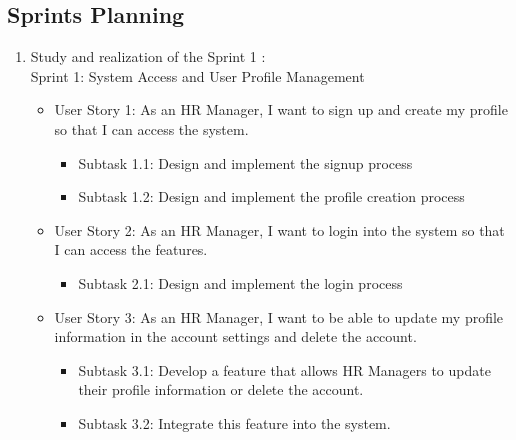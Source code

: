 \subsection{Sprints Planning}
\begin{enumerate}
    \item Study and realization of the Sprint 1 : \\
    Sprint 1: System Access and User Profile Management
    \begin{itemize}
        \renewcommand\labelitemi{-}
        \item User Story 1: As an HR Manager, I want to sign up and create my profile so that I can access the system. \\
        \begin{itemize}
            \item Subtask 1.1: Design and implement the signup process
            \item Subtask 1.2: Design and implement the profile creation process
        \end{itemize}    
        \item User Story 2: As an HR Manager, I want to login into the system so that I can access the features. \\
        \begin{itemize}
            \item Subtask 2.1: Design and implement the login process
        \end{itemize}   
        \item User Story 3: As an HR Manager, I want to be able to update my profile information in the account settings and delete the account. \\
        \begin{itemize}
            \item Subtask 3.1: Develop a feature that allows HR Managers to update their profile information or delete the account.
            \item Subtask 3.2: Integrate this feature into the system.
        \end{itemize}   
    \end{itemize}    


\end{enumerate}
